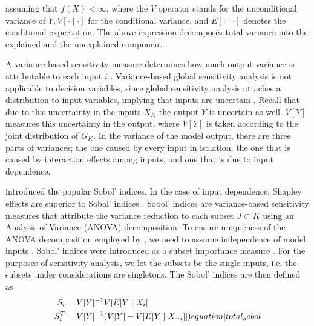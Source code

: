 \noindent assuming that $f(X) < \infty$, where the $V$ operator stands for the unconditional variance of $Y, V[\cdot \mid \cdot]$ for the conditional variance, and $E[\cdot \mid \cdot]$ denotes the conditional expectation. The above expression decomposes total variance into the explained and the unexplained component \citep{GM17}.

A variance-based sensitivity measure determines how much output variance is attributable to each input $i$ \citep{BP16}. Variance-based global sensitivity analysis is not applicable to decision variables, since global sensitivity analysis attaches a distribution to input variables, implying that inputs are uncertain \citep{SNS16}. Recall that due to this uncertainty in the inputs $X_K$ the output $Y$ is uncertain as well. $V[Y]$ measures this uncertainty in the output, where $V[Y]$ is taken according to the joint distribution of $G_K$. In the variance of the model output, there are three parts of variances; the one caused by every input in isolation, the one that is caused by interaction effects among inputs, and one that is due to input dependence.

\citet{S93} introduced the popular Sobol' indices. In the case of input dependence, Shapley effects are superior to Sobol' indices \citep{O14}. Sobol' indices are variance-based sensitivity measures that attribute the variance reduction to each subset $J \subset K$ using an Analysis of Variance (ANOVA) decomposition. To ensure uniqueness of the ANOVA decomposition employed by \citet{S53}, we need to assume independence of model inputs \citep{GM17}. Sobol' indices were introduced as a subset importance measure \citep{SNS16}. For the purposes of sensitivity analysis, we let the subsets be the single inputs, i.e. the subsets under considerations are singletons. The Sobol' indices are then defined as
\begin{align}
S_i &= V[Y]^{-1} V[E[Y \mid X_i]] \label{first_order_sobol}\\
S_i^T &= V[Y]^{-1}(V[Y] - V[E[Y \mid {X_{- i}}]])
\label[equation]{total_sobol}
\end{align}

